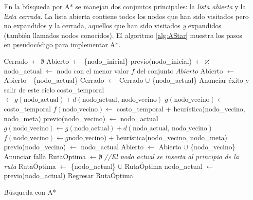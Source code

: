 \documentclass[letterpaper,12pt]{article}
\begin{document}
En la búsqueda por A* se manejan dos conjuntos principales: la \textit{lista abierta} y la \textit{lista cerrada}. La lista abierta contiene todos los nodos que han sido visitados pero no expandidos y la cerrada, aquellos que han sido visitados \textit{y} expandidos (también llamados nodos conocidos). El algoritmo \ref{alg:AStar} muestra los pasos en pseudocódigo para implementar A*. 
\begin{algorithm}
\DontPrintSemicolon
{}
Cerrado $\leftarrow \emptyset$\;
Abierto $\leftarrow$ \{nodo\_inicial\}\;
previo(nodo\_inicial) $\leftarrow \varnothing$\;
{
  nodo\_actual $\leftarrow$ nodo con el menor valor $f$ del conjunto $Abierto$\;
  Abierto $\leftarrow$ Abierto - \{nodo\_actual\}\;
  Cerrado $\leftarrow$ Cerrado $\cup$ \{nodo\_actual\}\;
  {
    Anunciar éxito y salir de este ciclo\;
  }
  {
    {
      costo\_temporal $\leftarrow g(\textrm{nodo\_actual}) + d(\textrm{nodo\_actual, nodo\_vecino})$\;
      {
        $g(\textrm{nodo\_vecino})\leftarrow$ costo\_temporal\;
        $f(\textrm{nodo\_vecino})\leftarrow$ costo\_temporal + heurística(nodo\_vecino, nodo\_meta)\;
        previo(nodo\_vecino) $\leftarrow$ nodo\_actual\;
      }
    }
    {
      $g(\textrm{nodo\_vecino})\leftarrow g(\textrm{nodo\_actual}) + d(\textrm{nodo\_actual, nodo\_vecino})$\;
      $f(\textrm{nodo\_vecino})\leftarrow g\textrm{nodo\_vecino})$  + heurística(nodo\_vecino, nodo\_meta)\;
      previo(nodo\_vecino) $\leftarrow$ nodo\_actual\;
      Abierto $\leftarrow$ Abierto $\cup$ \{nodo\_vecino\}\; 
    }
  }
}
{
  Anunciar falla\;
}
{
  RutaOptima $\leftarrow\emptyset$ \;
  {
    \textit{//El nodo actual se inserta al principio de la ruta}\;
    RutaÓptima $\leftarrow$ \{nodo\_actual\} $\cup$ RutaÓptima \;
    nodo\_actual $\leftarrow$ previo(nodo\_actual)\;
  }
  Regresar RutaÓptima
}
\caption{Búsqueda con A*}
\label{alg:AStar}
\end{algorithm}
\end{document}
